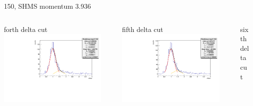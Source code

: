 \documentclass[aspectratio=169,xcolor=dvipsnames]{beamer}
\begin{document}
\begin{frame}{150, SHMS momentum 3.936}
\begin{columns}
\begin{column}[T]{0.33\textwidth}
\end{column}
\end{columns}
\begin{columns}
\begin{column}[T]{0.33\textwidth}
forth delta cut \\
\includegraphics[width = 0.9\textwidth]{results/pid/rftime/rftime_neg_150_3.pdf}
\end{column}
\begin{column}[T]{0.33\textwidth}
fifth delta cut \\
\includegraphics[width = 0.9\textwidth]{results/pid/rftime/rftime_neg_150_4.pdf}
\end{column}
\begin{column}[T]{0.33\textwidth}
sixth delta cut \\

\end{column}
\end{columns}
\end{frame}
\end{document}
